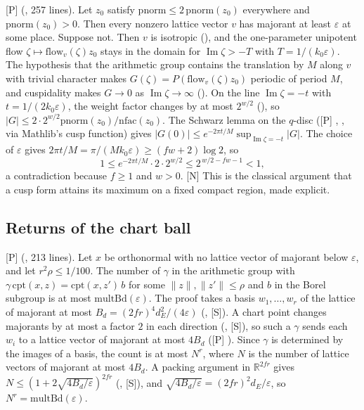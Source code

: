 \documentclass[11pt]{article}
\newcommand{\mP}{\textsf{[P]}}
\newcommand{\mS}{\textsf{[S]}}
\newcommand{\mN}{\textsf{[N]}}
\theoremstyle{remark}
\begin{document}
\mP{}  (, 257 lines). Let $z_0$ satisfy $\mathrm{pnorm}\le2\,\mathrm{pnorm}(z_0)$ everywhere and $\mathrm{pnorm}(z_0)>0$. Then every nonzero lattice vector $v$ has majorant at least $\varepsilon$ at some place. Suppose not. Then $v$ is isotropic (), and the one-parameter unipotent flow $\zeta\mapsto\mathrm{flow}_v(\zeta)z_0$ stays in the domain for $\operatorname{Im}\zeta>-T$ with $T=1/(k_0\varepsilon)$. The hypothesis that the arithmetic group contains the translation by $M$ along $v$ with trivial character makes $G(\zeta)=P(\mathrm{flow}_v(\zeta)z_0)$ periodic of period $M$, and cuspidality makes $G\to0$ as $\operatorname{Im}\zeta\to\infty$ (). On the line $\operatorname{Im}\zeta=-t$ with $t=1/(2k_0\varepsilon)$, the weight factor changes by at most $2^{w/2}$ (), so $\lvert G\rvert\le2\cdot2^{w/2}\mathrm{pnorm}(z_0)/\mathrm{nfac}(z_0)$. The Schwarz lemma on the $q$-disc (\mP{} , , via Mathlib's cusp function) gives $\lvert G(0)\rvert\le e^{-2\pi t/M}\sup_{\operatorname{Im}\zeta=-t}\lvert G\rvert$. The choice of $\varepsilon$ gives $2\pi t/M=\pi/(Mk_0\varepsilon)\ge(fw+2)\log2$, so
\[
1\le e^{-2\pi t/M}\cdot2\cdot2^{w/2}\le2^{\,w/2-fw-1}<1,
\]
a contradiction because $f\ge1$ and $w>0$. \mN{} This is the classical argument that a cusp form attains its maximum on a fixed compact region, made explicit.

\subsection{Returns of the chart ball}

\mP{}  (, 213 lines). Let $x$ be orthonormal with no lattice vector of majorant below $\varepsilon$, and let $r^2\rho\le1/100$. The number of $\gamma$ in the arithmetic group with $\gamma\,\mathrm{cpt}(x,z)=\mathrm{cpt}(x,z')\,b$ for some $\lVert z\rVert,\lVert z'\rVert\le\rho$ and $b$ in the Borel subgroup is at most $\mathrm{multBd}(\varepsilon)$. The proof takes a basis $w_1,\dots,w_r$ of the lattice of majorant at most $B_d=(2fr)^4d_E^2/(4\varepsilon)$ (, \mS). A chart point changes majorants by at most a factor $2$ in each direction (, \mS), so such a $\gamma$ sends each $w_i$ to a lattice vector of majorant at most $4B_d$ (\mP{} ). Since $\gamma$ is determined by the images of a basis, the count is at most $N^r$, where $N$ is the number of lattice vectors of majorant at most $4B_d$. A packing argument in $\mathbb R^{2fr}$ gives $N\le(1+2\sqrt{4B_d/\varepsilon})^{2fr}$ (, \mS), and $\sqrt{4B_d/\varepsilon}=(2fr)^2d_E/\varepsilon$, so $N^r=\mathrm{multBd}(\varepsilon)$.
\end{document}
